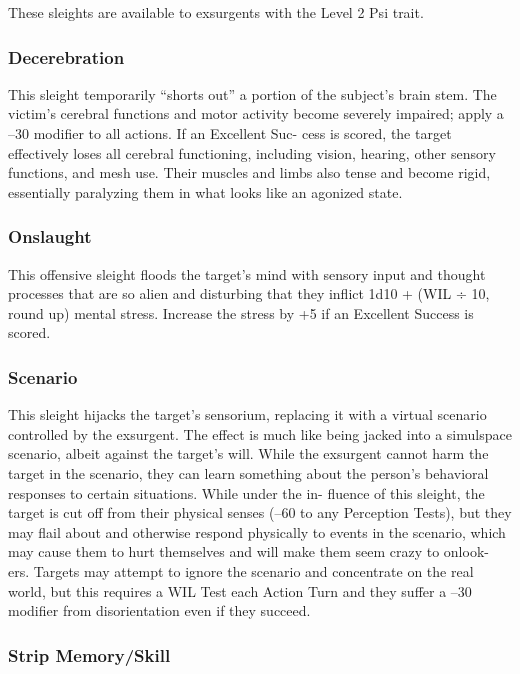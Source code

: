 These sleights are available to exsurgents with the 
Level 2 Psi trait.

\subsubsection{Decerebration }

This sleight temporarily ``shorts out'' a portion of the 
subject's brain stem. The victim's cerebral functions 
and motor activity become severely impaired; apply 
a –30 modifier to all actions. If an Excellent Suc-
cess is scored, the target effectively loses all cerebral 
functioning, including vision, hearing, other sensory 
functions, and mesh use. Their muscles and limbs also 
tense and become rigid, essentially paralyzing them in 
what looks like an agonized state.

\subsubsection{Onslaught}


This offensive sleight floods the target's mind with 
sensory input and thought processes that are so alien 
and disturbing that they inflict 1d10 + (WIL ÷ 10, 
round up) mental stress. Increase the stress by +5 if an 
Excellent Success is scored.

\subsubsection{Scenario }

This sleight hijacks the target's sensorium, replacing 
it with a virtual scenario controlled by the exsurgent. 
The effect is much like being jacked into a simulspace 
scenario, albeit against the target's will. While the 
exsurgent cannot harm the target in the scenario, they 
can learn something about the person's behavioral 
responses to certain situations. While under the in-
fluence of this sleight, the target is cut off from their 
physical senses (–60 to any Perception Tests), but they 
may flail about and otherwise respond physically to 
events in the scenario, which may cause them to hurt 
themselves and will make them seem crazy to onlook-
ers. Targets may attempt to ignore the scenario and 
concentrate on the real world, but this requires a WIL 
Test each Action Turn and they suffer a –30 modifier 
from disorientation even if they succeed. 

\subsubsection{Strip Memory/Skill }

